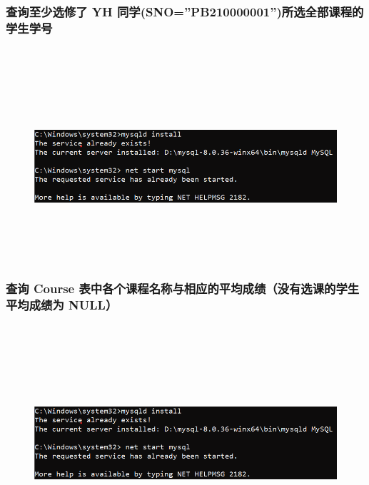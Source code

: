 \documentclass{ctexart}
\begin{document}
\subsubsection{查询至少选修了 YH 同学(SNO=”PB210000001”)所选全部课程的学生学号}
\begin{lstlisting}[language=sql]
	
\end{lstlisting}
\begin{figure}[H]
	\centering 
	\includegraphics[height=7cm,width=14cm]{1.png}
	\end{figure}
\subsubsection{查询 Course 表中各个课程名称与相应的平均成绩（没有选课的学生平均成绩为 NULL） }
\begin{lstlisting}[language=sql]
	
\end{lstlisting}
\begin{figure}[H]
	\centering 
	\includegraphics[height=7cm,width=14cm]{1.png}
	\end{figure}
\end{document}
